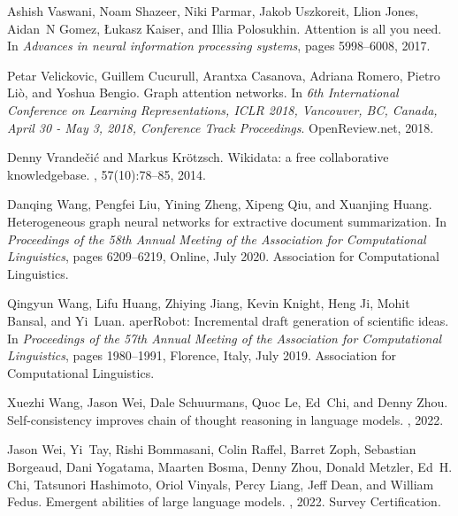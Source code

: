 \documentclass[11pt]{article}
\begin{document}
\begin{thebibliography}{100}
Ashish Vaswani, Noam Shazeer, Niki Parmar, Jakob Uszkoreit, Llion Jones,
  Aidan~N Gomez, {\L}ukasz Kaiser, and Illia Polosukhin.
\newblock Attention is all you need.
\newblock In {\em Advances in neural information processing systems}, pages
  5998--6008, 2017.

Petar Velickovic, Guillem Cucurull, Arantxa Casanova, Adriana Romero, Pietro
  Li{\`{o}}, and Yoshua Bengio.
\newblock Graph attention networks.
\newblock In {\em 6th International Conference on Learning Representations,
  {ICLR} 2018, Vancouver, BC, Canada, April 30 - May 3, 2018, Conference Track
  Proceedings}. OpenReview.net, 2018.

Denny Vrande{\v{c}}i{\'c} and Markus Kr{\"o}tzsch.
\newblock Wikidata: a free collaborative knowledgebase.
, 57(10):78--85, 2014.

Danqing Wang, Pengfei Liu, Yining Zheng, Xipeng Qiu, and Xuanjing Huang.
\newblock Heterogeneous graph neural networks for extractive document
  summarization.
\newblock In {\em Proceedings of the 58th Annual Meeting of the Association for
  Computational Linguistics}, pages 6209--6219, Online, July 2020. Association
  for Computational Linguistics.

Qingyun Wang, Lifu Huang, Zhiying Jiang, Kevin Knight, Heng Ji, Mohit Bansal,
  and Yi~Luan.
aper{R}obot: Incremental draft generation of scientific ideas.
\newblock In {\em Proceedings of the 57th Annual Meeting of the Association for
  Computational Linguistics}, pages 1980--1991, Florence, Italy, July 2019.
  Association for Computational Linguistics.

Xuezhi Wang, Jason Wei, Dale Schuurmans, Quoc Le, Ed~Chi, and Denny Zhou.
\newblock Self-consistency improves chain of thought reasoning in language
  models.
, 2022.

Jason Wei, Yi~Tay, Rishi Bommasani, Colin Raffel, Barret Zoph, Sebastian
  Borgeaud, Dani Yogatama, Maarten Bosma, Denny Zhou, Donald Metzler, Ed~H.
  Chi, Tatsunori Hashimoto, Oriol Vinyals, Percy Liang, Jeff Dean, and William
  Fedus.
\newblock Emergent abilities of large language models.
, 2022.
\newblock Survey Certification.


\end{thebibliography}
\end{document}
